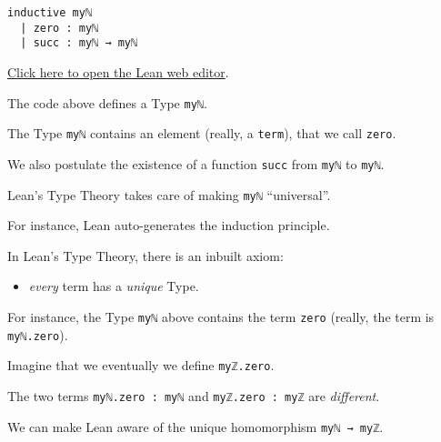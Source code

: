 \documentclass{beamer}
\begin{document}
\begin{frame}[fragile]

\begin{verbatim}
inductive myℕ
  | zero : myℕ
  | succ : myℕ → myℕ
\end{verbatim}
{\small{\href{https://leanprover-community.github.io/lean-web-editor/#code=inductive%20my%E2%84%95%0A%20%20%7C%20zero%20%3A%20my%E2%84%95%0A%20%20%7C%20succ%20%3A%20my%E2%84%95%20%E2%86%92%20my%E2%84%95%0A%0A%23print%20prefix%20my%E2%84%95%0A}{Click here to open the Lean web editor}.}}
\bigskip

The code above defines a Type {\color{violet}\verb`myℕ`}.
\bigskip

The Type {\color{violet}\verb`myℕ`} contains an element (really, a {\color{violet}\verb`term`}), that we call {\color{violet}\verb`zero`}.
\bigskip

We also postulate the existence of a function {\color{violet}\verb`succ`} from {\color{violet}\verb`myℕ`} to {\color{violet}\verb`myℕ`}.
\bigskip

Lean's Type Theory takes care of making {\color{violet}\verb`myℕ`} ``universal''.
\bigskip

For instance, Lean auto-generates the induction principle.
\end{frame}

\begin{frame}[fragile]

In Lean's Type Theory, there is an inbuilt axiom:

\begin{itemize}
\item
  {\emph{every}} term has a {\emph{unique}} Type.
\end{itemize}
\bigskip

For instance, the Type {\color{violet}\verb`myℕ`} above contains the term {\color{violet}\verb`zero`} (really, the term is {\color{violet}\verb`myℕ.zero`}).
\bigskip

Imagine that we eventually we define {\color{violet}\verb`myℤ.zero`}.
\bigskip

The two terms {\color{violet}\verb`myℕ.zero : myℕ`} and {\color{violet}\verb`myℤ.zero : myℤ`} are {\emph{different}}.
\bigskip

We can make Lean aware of the unique homomorphism {\color{violet}\verb`myℕ → myℤ`}.
\end{frame}
\end{document}
